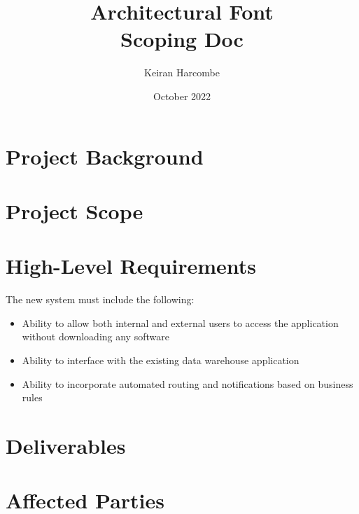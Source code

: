\documentclass[a4paper]{article}
\title{Architectural Font \\ Scoping Doc}
\author{Keiran Harcombe}
\date{October 2022}
\begin{document}
	\maketitle
	
\section{Project Background} %

\section{Project Scope} %

\section{High-Level Requirements} %
The new system must include the following:
\begin{itemize}
    \item Ability to allow both internal and external users to access the application without downloading any software 
    \item Ability to interface with the existing data warehouse application 
    \item Ability to incorporate automated routing and notifications based on business rules 
\end{itemize}

\section{Deliverables} %

\section{Affected Parties} %
\end{document}
